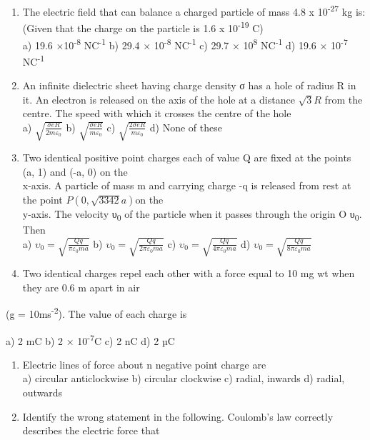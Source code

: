 \begin{enumerate}
\def\labelenumi{\arabic{enumi}.}
\setcounter{enumi}{26}
\item
  The electric field that can balance a charged particle of mass 4.8 x
  10\textsuperscript{-27} kg is: (Given that the charge on the particle
  is 1.6 x 10\textsuperscript{-19} C)\\
  a) 19.6 ×10\textsuperscript{-8} NC\textsuperscript{-1} b) 29.4 ×
  10\textsuperscript{-8} NC\textsuperscript{-1} c) 29.7 ×
  10\textsuperscript{8} NC\textsuperscript{-1} d) 19.6 ×
  10\textsuperscript{-7} NC\textsuperscript{-1}
\item
  An infinite dielectric sheet having charge density σ has a hole of
  radius R in it. An electron is released on the axis of the hole at a
  distance \(\sqrt{3}R\) from the centre. The speed with which it
  crosses the centre of the hole\\
  a) \(\sqrt{\frac{\sigma eR}{2m\varepsilon_{0}}}\) b)
  \(\sqrt{\frac{\sigma eR}{m\varepsilon_{0}}}\) c)
  \(\sqrt{\frac{2\sigma eR}{m\varepsilon_{0}}}\) d) None of these
\item
  Two identical positive point charges each of value Q are fixed at the
  points (a, 1) and (-a, 0) on the\\
  x-axis. A particle of mass m and carrying charge -q is released from
  rest at the point \(P\left( 0,\sqrt{3342}a \right)\)on the\\
  y-axis. The velocity υ\textsubscript{0} of the particle when it passes
  through the origin O υ\textsubscript{0}. Then\\
  a) \(\upsilon_{0} = \sqrt{\frac{Qq}{\pi\varepsilon_{0}ma}}\) b)
  \(\upsilon_{0} = \sqrt{\frac{Qq}{2\pi\varepsilon_{0}ma}}\) c)
  \(\upsilon_{0} = \sqrt{\frac{Qq}{4\pi\varepsilon_{0}ma}}\) d)
  \(\upsilon_{0} = \sqrt{\frac{Qq}{8\pi\varepsilon_{0}ma}}\)
\item
  Two identical charges repel each other with a force equal to 10 mg wt
  when they are 0.6 m apart in air
\end{enumerate}

(g = 10ms\textsuperscript{-2}). The value of each charge is

a) 2 mC b) 2 × 10\textsuperscript{-7}C c) 2 nC d) 2 µC

\begin{enumerate}
\def\labelenumi{\arabic{enumi}.}
\setcounter{enumi}{30}
\item
  Electric lines of force about n negative point charge are\\
  a) circular anticlockwise b) circular clockwise c) radial, inwards d)
  radial, outwards
\item
  Identify the wrong statement in the following. Coulomb's law correctly
  describes the electric force that
\end{enumerate}

